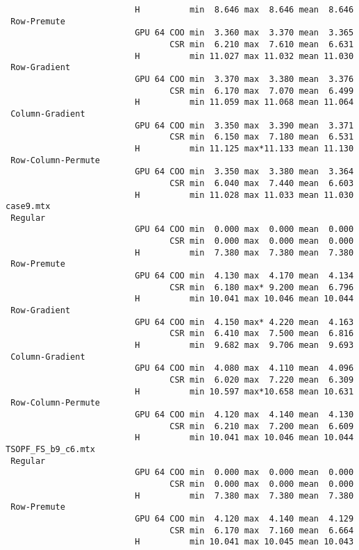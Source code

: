 {\begin{verbatim}
                          H          min  8.646 max  8.646 mean  8.646
 Row-Premute
                          GPU 64 COO min  3.360 max  3.370 mean  3.365
                                 CSR min  6.210 max  7.610 mean  6.631
                          H          min 11.027 max 11.032 mean 11.030
 Row-Gradient
                          GPU 64 COO min  3.370 max  3.380 mean  3.376
                                 CSR min  6.170 max  7.070 mean  6.499
                          H          min 11.059 max 11.068 mean 11.064
 Column-Gradient
                          GPU 64 COO min  3.350 max  3.390 mean  3.371
                                 CSR min  6.150 max  7.180 mean  6.531
                          H          min 11.125 max*11.133 mean 11.130
 Row-Column-Permute
                          GPU 64 COO min  3.350 max  3.380 mean  3.364
                                 CSR min  6.040 max  7.440 mean  6.603
                          H          min 11.028 max 11.033 mean 11.030
case9.mtx
 Regular
                          GPU 64 COO min  0.000 max  0.000 mean  0.000
                                 CSR min  0.000 max  0.000 mean  0.000
                          H          min  7.380 max  7.380 mean  7.380
 Row-Premute
                          GPU 64 COO min  4.130 max  4.170 mean  4.134
                                 CSR min  6.180 max* 9.200 mean  6.796
                          H          min 10.041 max 10.046 mean 10.044
 Row-Gradient
                          GPU 64 COO min  4.150 max* 4.220 mean  4.163
                                 CSR min  6.410 max  7.500 mean  6.816
                          H          min  9.682 max  9.706 mean  9.693
 Column-Gradient
                          GPU 64 COO min  4.080 max  4.110 mean  4.096
                                 CSR min  6.020 max  7.220 mean  6.309
                          H          min 10.597 max*10.658 mean 10.631
 Row-Column-Permute
                          GPU 64 COO min  4.120 max  4.140 mean  4.130
                                 CSR min  6.210 max  7.200 mean  6.609
                          H          min 10.041 max 10.046 mean 10.044
TSOPF_FS_b9_c6.mtx
 Regular
                          GPU 64 COO min  0.000 max  0.000 mean  0.000
                                 CSR min  0.000 max  0.000 mean  0.000
                          H          min  7.380 max  7.380 mean  7.380
 Row-Premute
                          GPU 64 COO min  4.120 max  4.140 mean  4.129
                                 CSR min  6.170 max  7.160 mean  6.664
                          H          min 10.041 max 10.045 mean 10.043

\end{verbatim}}
